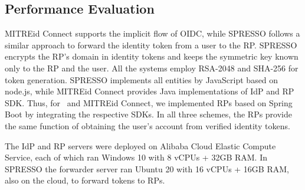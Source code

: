 \subsection{Performance Evaluation}
\label{sec:evaluation}


MITREid Connect supports the implicit flow of OIDC, while SPRESSO follows a similar approach to forward the identity token from a user to the RP.
SPRESSO encrypts the RP's domain in identity tokens and keeps the symmetric key known only to the RP and the user. All the systems employ RSA-2048 and SHA-256 for token generation.
SPRESSO implements all entities by JavaScript based on node.js, while MITREid Connect provides Java implementations of IdP and RP SDK.
Thus, for \usso\ and MITREid Connect, we implemented RPs based on Spring Boot by integrating the respective SDKs. In all three schemes, the RPs provide the same function of obtaining the user's account from verified identity tokens.

The IdP and RP servers were deployed on Alibaba Cloud Elastic Compute Service,
each of which ran Windows 10 with 8 vCPUs + 32GB RAM. In SPRESSO the forwarder server ran Ubuntu 20 with 16 vCPUs + 16GB RAM, also on the cloud, to forward tokens to RPs.

